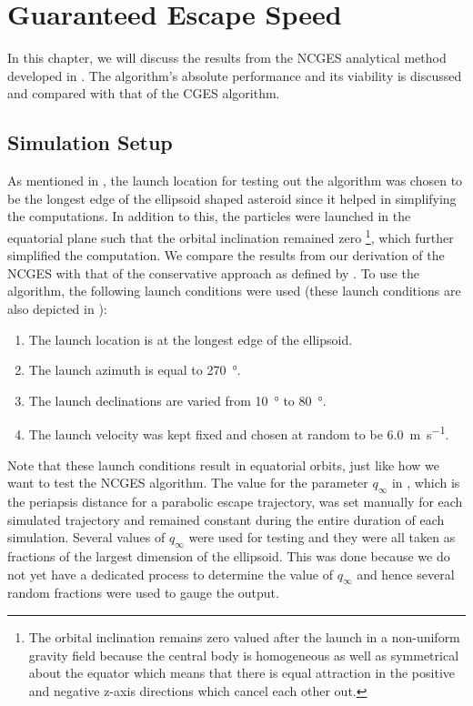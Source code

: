\chapter{Guaranteed Escape Speed}
\label{chap:nonconservative}
\graphicspath{{Results/Images/}}

In this chapter, we will discuss the results from the \gls{NCGES} analytical method developed in . The algorithm's absolute performance and its viability is discussed and compared with that of the \gls{CGES} algorithm.

\section{Simulation Setup}
\label{sec:nonconservative_simulation_setup}
As mentioned in , the launch location for testing out the algorithm was chosen to be the longest edge of the ellipsoid shaped asteroid since it helped in simplifying the computations. In addition to this, the particles were launched in the equatorial plane such that the orbital inclination remained zero \footnote{The orbital inclination remains zero valued after the launch in a non-uniform gravity field because the central body is homogeneous as well as symmetrical about the equator which means that there is equal attraction in the positive and negative z-axis directions which cancel each other out.}, which further simplified the computation.
%
\newline\newline
%
We compare the results from our derivation of the \gls{NCGES} with that of the conservative approach as defined by \cite{scheeresBook}. To use the algorithm, the following launch conditions were used (these launch conditions are also depicted in ):
\begin{enumerate}
    \item The launch location is at the longest edge of the ellipsoid.
    \item The launch azimuth is equal to \SI{270}{\degree}.
    \item The launch declinations are varied from \SI{10}{\degree} to \SI{80}{\degree}.
    \item The launch velocity was kept fixed and chosen at random to be \SI{6.0}{\metre \per \second}.
\end{enumerate}
Note that these launch conditions result in equatorial orbits, just like how we want to test the \gls{NCGES} algorithm. The value for the parameter $q_\infty$ in , which is the periapsis distance for a parabolic escape trajectory, was set manually for each simulated trajectory and remained constant during the entire duration of each simulation. Several values of $q_\infty$ were used for testing and they were all taken as fractions of the largest dimension of the ellipsoid. This was done because we do not yet have a dedicated process to determine the value of $q_\infty$ and hence several random fractions were used to gauge the output.
